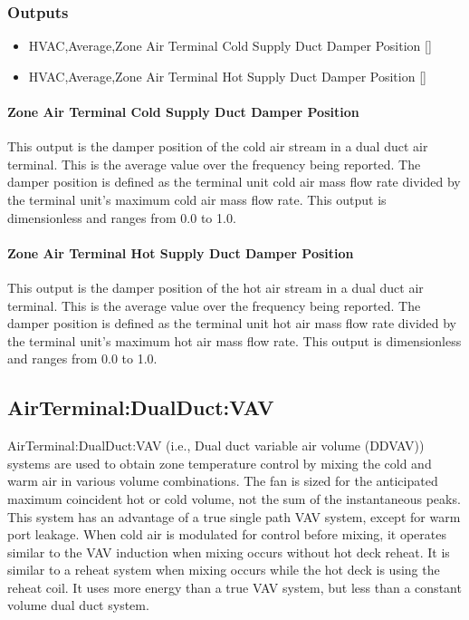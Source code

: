 \subsubsection{Outputs}\label{outputs-12}

\begin{itemize}
\item
  HVAC,Average,Zone Air Terminal Cold Supply Duct Damper Position {[]}
\item
  HVAC,Average,Zone Air Terminal Hot Supply Duct Damper Position {[]}
\end{itemize}

\paragraph{Zone Air Terminal Cold Supply Duct Damper Position}\label{zone-air-terminal-cold-supply-duct-damper-position}

This output is the damper position of the cold air stream in a dual duct air terminal. This is the average value over the frequency being reported. The damper position is defined as the terminal unit cold air mass flow rate divided by the terminal unit's maximum cold air mass flow rate. This output is dimensionless and ranges from 0.0 to 1.0.

\paragraph{Zone Air Terminal Hot Supply Duct Damper Position}\label{zone-air-terminal-hot-supply-duct-damper-position}

This output is the damper position of the hot air stream in a dual duct air terminal. This is the average value over the frequency being reported. The damper position is defined as the terminal unit hot air mass flow rate divided by the terminal unit's maximum hot air mass flow rate. This output is dimensionless and ranges from 0.0 to 1.0.

\subsection{AirTerminal:DualDuct:VAV}\label{airterminaldualductvav}

AirTerminal:DualDuct:VAV (i.e., Dual duct variable air volume (DDVAV)) systems are used to obtain zone temperature control by mixing the cold and warm air in various volume combinations. The fan is sized for the anticipated maximum coincident hot or cold volume, not the sum of the instantaneous peaks. This system has an advantage of a true single path VAV system, except for warm port leakage. When cold air is modulated for control before mixing, it operates similar to the VAV induction when mixing occurs without hot deck reheat. It is similar to a reheat system when mixing occurs while the hot deck is using the reheat coil. It uses more energy than a true VAV system, but less than a constant volume dual duct system.

